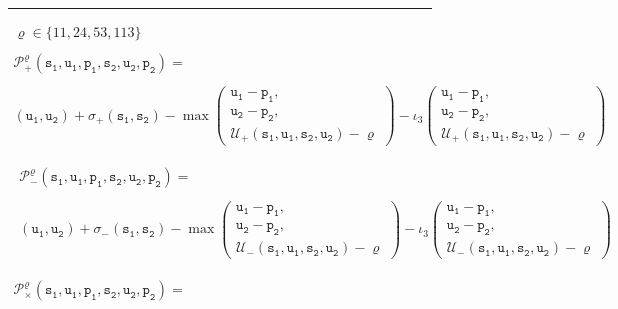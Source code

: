 \begin{figure}[tb]
\hrule			
$$
\begin{array}{c}
\varrho\in\{11,24,53,113\}\\
\\
\mathcal{P}_+^\varrho(\mathtt{s_1},\mathtt{u_1},\mathtt{p_1},\mathtt{s_2},\mathtt{u_2},\mathtt{p_2}) =\\
\\
(\mathtt{u_1},\mathtt{u_2})+\sigma_+(\mathtt{s_1},\mathtt{s_2})-
\max\left(\begin{array}{c}
\mathtt{u_1}-\mathtt{p_1},\\
\mathtt{u_2}-\mathtt{p_2},\\
\mathcal{U}_{+}(\mathtt{s_1},\mathtt{u_1},\mathtt{s_2},\mathtt{u_2})-\varrho
\end{array}\right)
-\iota_3
\left(\begin{array}{c}
\mathtt{u_1}-\mathtt{p_1},\\
\mathtt{u_2}-\mathtt{p_2},\\
\mathcal{U}_{+}(\mathtt{s_1},\mathtt{u_1},\mathtt{s_2},\mathtt{u_2})-\varrho
\end{array}\right)
\\
\\
\\
\begin{array}{c}
\mathcal{P}_-^\varrho(\mathtt{s_1},\mathtt{u_1},\mathtt{p_1},\mathtt{s_2},\mathtt{u_2},\mathtt{p_2}) =\\
\\
(\mathtt{u_1},\mathtt{u_2})+\sigma_-(\mathtt{s_1},\mathtt{s_2})- 
\max\left(\begin{array}{c}
\mathtt{u_1}-\mathtt{p_1},\\
\mathtt{u_2}-\mathtt{p_2},\\
\mathcal{U}_{-}(\mathtt{s_1},\mathtt{u_1},\mathtt{s_2},\mathtt{u_2})-\varrho
\end{array}\right)
-\iota_3
\left(\begin{array}{c}
\mathtt{u_1}-\mathtt{p_1},\\
\mathtt{u_2}-\mathtt{p_2},\\
\mathcal{U}_{-}(\mathtt{s_1},\mathtt{u_1},\mathtt{s_2},\mathtt{u_2})-\varrho
\end{array}\right)
\end{array}
\\
\\
\\
\mathcal{P}_\times^\varrho(\mathtt{s_1},\mathtt{u_1},\mathtt{p_1},\mathtt{s_2},\mathtt{u_2},\mathtt{p_2}) = \\

\end{array}$$
\end{figure}
